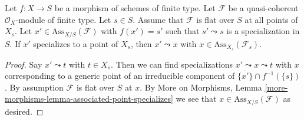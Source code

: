 \begin{lemma}
\label{lemma-associated-point-specializes}
Let $f : X \to S$ be a morphism of schemes of finite type.
Let $\mathcal{F}$ be a quasi-coherent $\mathcal{O}_X$-module of finite type.
Let $s \in S$.
Assume that $\mathcal{F}$ is flat over $S$ at all points of $X_s$.
Let $x' \in \text{Ass}_{X/S}(\mathcal{F})$ with $f(x') = s'$
such that $s' \leadsto s$ is a specialization in $S$. If
$x'$ specializes to a point of $X_s$, then $x' \leadsto x$
with $x \in \text{Ass}_{X_s}(\mathcal{F}_s)$.
\end{lemma}

\begin{proof}
Say $x' \leadsto t$ with $t \in X_s$. Then we can find specializations
$x' \leadsto x \leadsto t$ with $x$ corresponding to a generic
point of an irreducible component of
$\overline{\{x'\}} \cap f^{-1}(\{s\})$. By assumption $\mathcal{F}$ is flat
over $S$ at $x$. By More on Morphisms, Lemma
\ref{more-morphisms-lemma-associated-point-specializes}
we see that $x \in \text{Ass}_{X/S}(\mathcal{F})$ as desired.
\end{proof}
